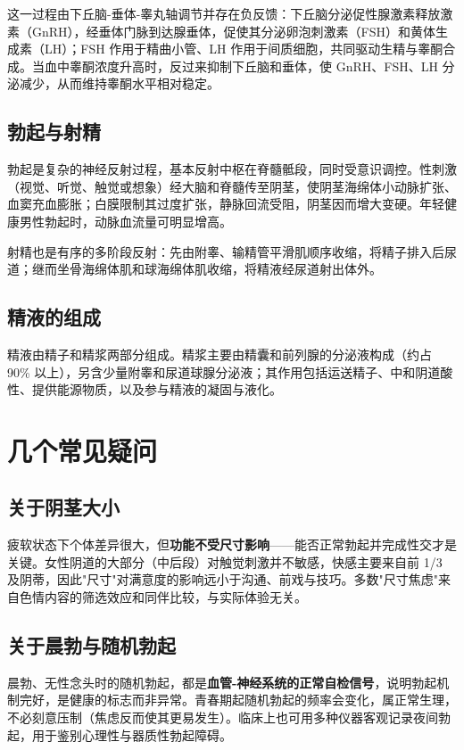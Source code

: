 \documentclass[12pt,UTF8,openany]{ctexbook}
\begin{document}
这一过程由下丘脑-垂体-睾丸轴调节并存在负反馈：下丘脑分泌促性腺激素释放激素（GnRH），经垂体门脉到达腺垂体，促使其分泌卵泡刺激素（FSH）和黄体生成素（LH）；FSH 作用于精曲小管、LH 作用于间质细胞，共同驱动生精与睾酮合成。当血中睾酮浓度升高时，反过来抑制下丘脑和垂体，使 GnRH、FSH、LH 分泌减少，从而维持睾酮水平相对稳定。

\subsection*{勃起与射精}

勃起是复杂的神经反射过程，基本反射中枢在脊髓骶段，同时受意识调控。性刺激（视觉、听觉、触觉或想象）经大脑和脊髓传至阴茎，使阴茎海绵体小动脉扩张、血窦充血膨胀；白膜限制其过度扩张，静脉回流受阻，阴茎因而增大变硬。年轻健康男性勃起时，动脉血流量可明显增高。

射精也是有序的多阶段反射：先由附睾、输精管平滑肌顺序收缩，将精子排入后尿道；继而坐骨海绵体肌和球海绵体肌收缩，将精液经尿道射出体外。

\subsection*{精液的组成}

精液由精子和精浆两部分组成。精浆主要由精囊和前列腺的分泌液构成（约占 90\% 以上），另含少量附睾和尿道球腺分泌液；其作用包括运送精子、中和阴道酸性、提供能源物质，以及参与精液的凝固与液化。

\section{几个常见疑问}

\subsection*{关于阴茎大小}

疲软状态下个体差异很大，但\textbf{功能不受尺寸影响}——能否正常勃起并完成性交才是关键。女性阴道的大部分（中后段）对触觉刺激并不敏感，快感主要来自前 1/3 及阴蒂，因此"尺寸"对满意度的影响远小于沟通、前戏与技巧。多数"尺寸焦虑"来自色情内容的筛选效应和同伴比较，与实际体验无关。

\subsection*{关于晨勃与随机勃起}

晨勃、无性念头时的随机勃起，都是\textbf{血管-神经系统的正常自检信号}，说明勃起机制完好，是健康的标志而非异常。青春期起随机勃起的频率会变化，属正常生理，不必刻意压制（焦虑反而使其更易发生）。临床上也可用多种仪器客观记录夜间勃起，用于鉴别心理性与器质性勃起障碍。
\end{document}
